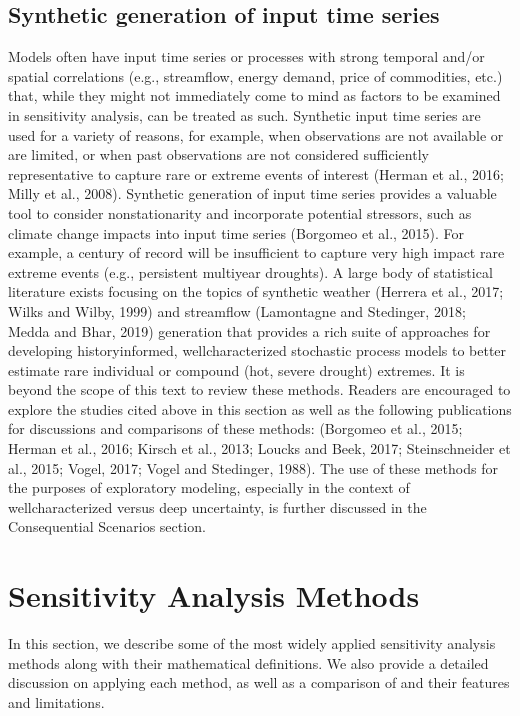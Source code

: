\documentclass[letterpaper,10pt,english]{sphinxmanual}
\begin{document}
\subsection{Synthetic generation of input time series}
\label{\detokenize{3_sensitivity_analysis_the_basics:synthetic-generation-of-input-time-series}}
\sphinxAtStartPar
Models often have input time series or processes with strong temporal and/or spatial correlations (e.g., streamflow, energy demand, price of commodities, etc.) that, while they might not immediately come to mind as factors to be examined in sensitivity analysis, can be treated as such. Synthetic input time series are used for a variety of reasons, for example, when observations are not available or are limited, or when past observations are not considered sufficiently representative to capture rare or extreme events of interest (Herman et al., 2016; Milly et al., 2008). Synthetic generation of input time series provides a valuable tool to consider non\sphinxhyphen{}stationarity and incorporate potential stressors, such as climate change impacts into input time series (Borgomeo et al., 2015). For example, a century of record will be insufficient to capture very high impact rare extreme events (e.g., persistent multi\sphinxhyphen{}year droughts). A large body of statistical literature exists focusing on the topics of synthetic weather (Herrera et al., 2017; Wilks and Wilby, 1999) and streamflow (Lamontagne and Stedinger, 2018; Medda and Bhar, 2019) generation that provides a rich suite of approaches for developing history\sphinxhyphen{}informed, well\sphinxhyphen{}characterized stochastic process models to better estimate rare individual or compound (hot, severe drought) extremes. It is beyond the scope of this text to review these methods. Readers are encouraged to explore the studies cited above in this section as well as the following publications for discussions and comparisons of these methods: (Borgomeo et al., 2015; Herman et al., 2016; Kirsch et al., 2013; Loucks and Beek, 2017; Steinschneider et al., 2015; Vogel, 2017; Vogel and Stedinger, 1988). The use of these methods for the purposes of exploratory modeling, especially in the context of well\sphinxhyphen{}characterized versus deep uncertainty, is further discussed in the Consequential Scenarios section.


\section{Sensitivity Analysis Methods}
\label{\detokenize{3_sensitivity_analysis_the_basics:sensitivity-analysis-methods}}
\sphinxAtStartPar
In this section, we describe some of the most widely applied sensitivity analysis methods along with their mathematical definitions. We also provide a detailed discussion on applying each method, as well as a comparison of and their features and limitations.
\end{document}

